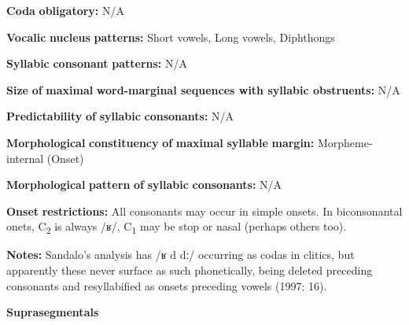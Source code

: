 \begin{styleBody}
\textbf{Coda} \textbf{obligatory:} N/A
\end{styleBody}

\begin{styleBody}
\textbf{Vocalic} \textbf{nucleus} \textbf{patterns:} Short vowels, Long vowels, Diphthongs
\end{styleBody}

\begin{styleBody}
\textbf{Syllabic} \textbf{consonant} \textbf{patterns:} N/A
\end{styleBody}

\begin{styleBody}
\textbf{Size} \textbf{of} \textbf{maximal} \textbf{word{}-marginal sequences with syllabic obstruents:} N/A
\end{styleBody}

\begin{styleBody}
\textbf{Predictability} \textbf{of} \textbf{syllabic} \textbf{consonants:} N/A
\end{styleBody}

\begin{styleBody}
\textbf{Morphological} \textbf{constituency} \textbf{of} \textbf{maximal} \textbf{syllable} \textbf{margin:} Morpheme-internal (Onset)
\end{styleBody}

\begin{styleBody}
\textbf{Morphological} \textbf{pattern} \textbf{of} \textbf{syllabic} \textbf{consonants:} N/A
\end{styleBody}

\begin{styleBody}
\textbf{Onset} \textbf{restrictions:} All consonants may occur in simple onsets. In biconsonantal onets, C\textsubscript{2} is always /ʁ/, C\textsubscript{1} may be stop or nasal (perhaps others too).
\end{styleBody}

\begin{styleBody}
\textbf{Notes:} Sandalo’s analysis has /ʁ d dː/ occurring as codas in clitics, but apparently these never surface as such phonetically, being deleted preceding consonants and resyllabified as onsets preceding vowels (1997: 16).
\end{styleBody}

\begin{styleBody}
\textbf{Suprasegmentals}
\end{styleBody}


